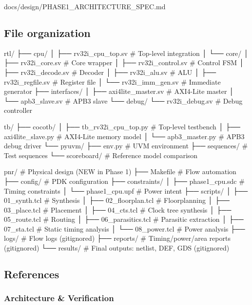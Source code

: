 \begin{relocated}{docs/design/PHASE1_ARCHITECTURE_SPEC.md}
\subsection{File organization}\label{ds:ch:phase1-architecture:file-organization}

\begin{logblock}
rtl/
├── cpu/
│   ├── rv32i_cpu_top.sv       # Top-level integration
│   └── core/
│       ├── rv32i_core.sv      # Core wrapper
│       ├── rv32i_control.sv   # Control FSM
│       ├── rv32i_decode.sv    # Decoder
│       ├── rv32i_alu.sv       # ALU
│       ├── rv32i_regfile.sv   # Register file
│       └── rv32i_imm_gen.sv   # Immediate generator
├── interfaces/
│   ├── axi4lite_master.sv     # AXI4-Lite master
│   └── apb3_slave.sv          # APB3 slave
└── debug/
    └── rv32i_debug.sv         # Debug controller

tb/
├── cocotb/
│   ├── tb_rv32i_cpu_top.py    # Top-level testbench
│   ├── axi4lite_slave.py      # AXI4-Lite memory model
│   └── apb3_master.py         # APB3 debug driver
└── pyuvm/
    ├── env.py                 # UVM environment
    ├── sequences/             # Test sequences
    └── scoreboard/            # Reference model comparison

pnr/                           # Physical design (NEW in Phase 1)
├── Makefile                   # Flow automation
├── config/                    # PDK configuration
├── constraints/
│   ├── phase1_cpu.sdc         # Timing constraints
│   └── phase1_cpu.upf         # Power intent
├── scripts/
│   ├── 01_synth.tcl           # Synthesis
│   ├── 02_floorplan.tcl       # Floorplanning
│   ├── 03_place.tcl           # Placement
│   ├── 04_cts.tcl             # Clock tree synthesis
│   ├── 05_route.tcl           # Routing
│   ├── 06_parasitics.tcl      # Parasitic extraction
│   ├── 07_sta.tcl             # Static timing analysis
│   └── 08_power.tcl           # Power analysis
├── logs/                      # Flow logs (gitignored)
├── reports/                   # Timing/power/area reports (gitignored)
└── results/                   # Final outputs: netlist, DEF, GDS (gitignored)
\end{logblock}

\subsection{References}\label{ds:ch:phase1-architecture:references}

\subsubsection{Architecture \& Verification}\label{ds:ch:phase1-architecture:architecture-verification}


\end{relocated}
